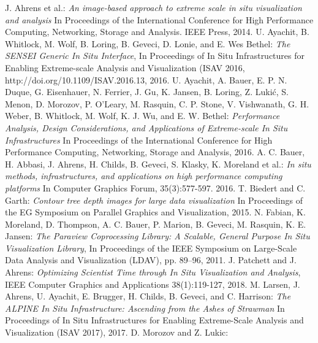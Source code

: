 \begin{thebibliography}{0}
    J. Ahrens et al.:
    \textsl{An image-based approach to extreme scale in situ visualization and analysis} 
    In Proceedings of the International Conference for High Performance Computing, Networking, Storage and Analysis. IEEE Press, 2014.
    U. Ayachit, B. Whitlock, M. Wolf, B. Loring, B. Geveci, D. Lonie, and E. Wes Bethel:
    \textsl{The SENSEI Generic In Situ Interface}, 
    In Proceedings of In Situ Infrastructures for Enabling Extreme-scale Analysis and Visualization (ISAV 2016, http://doi.org/10.1109/ISAV.2016.13, 2016.
    U. Ayachit, A. Bauer, E. P. N. Duque, G. Eisenhauer, N. Ferrier, J. Gu, K. Jansen, B. Loring, Z. Lukić, S. Menon, D. Morozov, P. O’Leary, M. Rasquin, C. P. Stone, V. Vishwanath, G. H. Weber, B. Whitlock, M. Wolf, K. J. Wu, and E. W. Bethel:
    \textsl{Performance Analysis, Design Considerations, and Applications of Extreme-scale In Situ Infrastructures}
    In Proceedings of the International Conference for High Performance Computing, Networking, Storage and Analysis, 2016.
    A. C. Bauer, H. Abbasi, J. Ahrens, H.  Childs, B. Geveci, S. Klasky, K. Moreland et al.: 
    \textsl{In situ methods, infrastructures, and applications on high performance computing platforms}
    In Computer Graphics Forum, 35(3):577-597. 2016.
    T. Biedert and C. Garth:
    \textsl{Contour tree depth images for large data visualization}
    In Proceedings of the EG Symposium on Parallel Graphics and Visualization, 2015.
    N. Fabian, K. Moreland, D. Thompson, A. C. Bauer, P. Marion, B. Geveci, M. Rasquin, K. E. Jansen: 
    \textsl{The Paraview Coprocessing Library: A Scalable, General Purpose In Situ Visualization Library},
    In Proceedings of the IEEE Symposium on Large-Scale Data Analysis and Visualization (LDAV), pp. 89–96, 2011.
    J. Patchett and J. Ahrens:
    \textsl{Optimizing Scientist Time through In Situ Visualization and Analysis},
    IEEE Computer Graphics and Applications 38(1):119-127, 2018.
    M. Larsen, J. Ahrens, U. Ayachit, E. Brugger, H. Childs, B. Geveci, and C. Harrison:
    \textsl{The ALPINE In Situ Infrastructure: Ascending from the Ashes of Strawman}
    In Proceedings of In Situ Infrastructures for Enabling Extreme-Scale Analysis and Visualization (ISAV 2017), 2017. 
    D. Morozov and Z. Lukic: 

\end{thebibliography}
